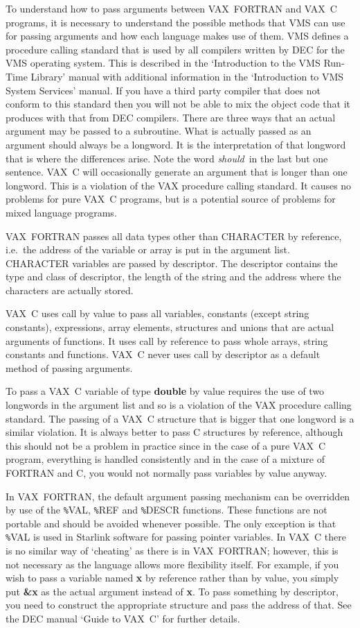 To understand how to pass arguments between VAX~FORTRAN and VAX~C programs, it
is necessary to understand the possible methods that VMS can use for passing
arguments and how each language makes use of them. VMS defines a procedure
calling standard that is used by all compilers written by DEC for the VMS
operating system. This is described in the `Introduction to the VMS Run-Time
Library' manual with additional information in the `Introduction to VMS System
Services' manual. If you have a third party compiler that does not conform to
this standard then you will not be able to mix the object code that it produces
with that from DEC compilers. There are three ways that an actual argument may
be passed to a subroutine. What is actually passed as an argument should always
be a longword. It is the interpretation of that longword that is where the
differences arise. Note the word {\em should}\, in the last but one sentence.
VAX~C will occasionally generate an argument that is longer than one longword.
This is a violation of the VAX procedure calling standard. It causes no
problems for pure VAX~C programs, but is a potential source of problems for
mixed language programs.

VAX~FORTRAN passes all data types other than CHARACTER by reference, i.e.\ the
address of the variable or array is put in the argument list. CHARACTER
variables are passed by descriptor. The descriptor contains the type and class
of descriptor, the length of the string and the address where the characters
are actually stored.

VAX~C uses call by value to pass all variables, constants (except string
constants), expressions, array elements, structures and unions that are actual
arguments of functions. It uses call by reference to pass whole arrays, string
constants and functions. VAX~C never uses call by descriptor as a default
method of passing arguments.

To pass a VAX~C variable of type {\bf double} by value requires the use of two
longwords in the argument list and so is a violation of the VAX procedure
calling standard. The passing of a VAX~C structure that is bigger that one
longword is a similar violation. It is always better to pass C structures by
reference, although this should not be a problem in practice since in the case
of a pure VAX~C program, everything is handled consistently and in the case of
a mixture of FORTRAN and C, you would not normally pass variables by value
anyway.

In VAX~FORTRAN, the default argument passing mechanism can be overridden by use
of the {\tt \%}VAL, {\tt \%}REF and {\tt \%}DESCR functions. These functions
are not portable and should be avoided whenever possible. The only exception is
that {\tt \%}VAL is used in Starlink software for passing pointer variables. In
VAX~C there is no similar way of `cheating' as there is in VAX~FORTRAN;
however, this is not necessary as the language allows more flexibility itself.
For example, if you wish to pass a variable named {\bf x} by reference rather
than by value, you simply put {\bf \&x} as the actual argument instead of {\bf
x}. To pass something by descriptor, you need to construct the appropriate
structure and pass the address of that. See the DEC manual `Guide to VAX~C' for
further details.

